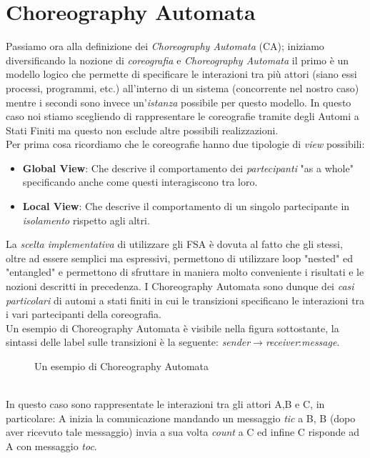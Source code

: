 \section{Choreography Automata}
Passiamo ora alla definizione dei \emph{Choreography Automata} (CA); iniziamo diversificando la nozione di \emph{coreografia} e \emph{Choreography Automata}\cite{Choreography_Automata} il primo è un modello logico che permette di specificare le interazioni tra più attori (siano essi processi, programmi, etc.) all'interno di un sistema (concorrente nel nostro caso) mentre i secondi sono invece un'\emph{istanza} possibile per questo modello. In questo caso noi stiamo scegliendo di rappresentare le coreografie tramite degli Automi a Stati Finiti ma questo non esclude altre possibili realizzazioni.\\
Per prima cosa ricordiamo che le coreografie hanno due tipologie di \emph{view} possibili:
\begin{itemize}
    \item \textbf{Global View}: Che descrive il comportamento dei \emph{partecipanti} "as a whole" specificando anche come questi interagiscono tra loro.
    \item \textbf{Local View}: Che descrive il comportamento di un singolo partecipante in \emph{isolamento} rispetto agli altri.
\end{itemize}
La \emph{scelta implementativa} di utilizzare gli FSA è dovuta al fatto che gli stessi, oltre ad essere semplici ma espressivi, permettono di utilizzare loop "nested" ed "entangled" e permettono di sfruttare in maniera molto conveniente i risultati e le nozioni descritti in precedenza. I Choreography Automata sono dunque dei \emph{casi particolari} di automi a stati finiti in cui le transizioni specificano le interazioni tra i vari partecipanti della coreografia.\\
Un esempio di Choreography Automata è visibile nella figura sottostante, la sintassi delle label sulle transizioni è la seguente: \emph{sender}$\rightarrow$\emph{receiver}:\emph{message}.
\begin{figure}[ht]
    \centering
    \caption{Un esempio di Choreography Automata}
    \label{fig:ChoreographyAutomata_Example}
\end{figure}\\
In questo caso sono rappresentate le interazioni tra gli attori A,B e C, in particolare: A inizia la comunicazione mandando un messaggio \emph{tic} a B, B (dopo aver ricevuto tale messaggio) invia a sua volta \emph{count} a C ed infine C risponde ad A con messaggio \emph{toc}.

